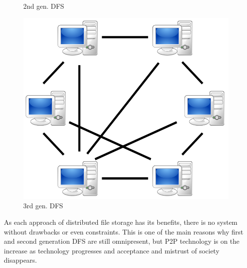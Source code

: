 \begin{figure}
\begin{minipage}{.33\textwidth}
		\caption[myfakelabel]{2nd gen. DFS}
		\label{2nd_gen_dfs}
	\end{minipage}
	\begin{minipage}{.33\textwidth}
		\centering
		\includegraphics[scale=0.175]{Talk5/3rd_gen_dfs.PNG}
		\caption[myfakelabel]{3rd gen. DFS\footnotemark[1]{}}
		\label{3rd_gen_dfs}
	\end{minipage}
\end{figure}

As each approach of distributed file storage has its benefits, there is no system without drawbacks or even constraints. This is one of the main reasons why first and second generation DFS are still omnipresent, but P2P technology is on the increase as technology progresses and acceptance and mistrust of society disappears. %

